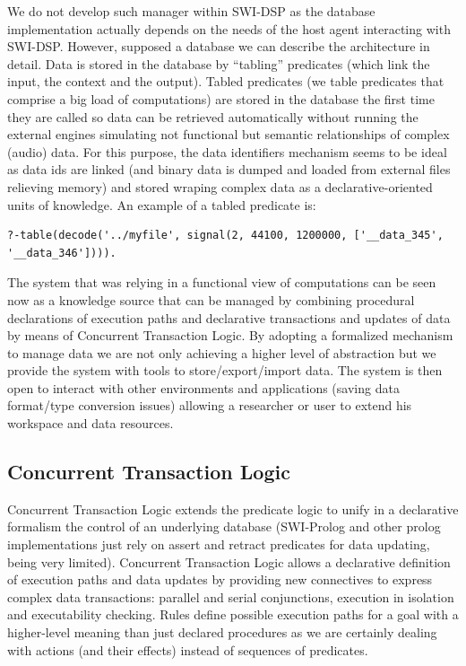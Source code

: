 \documentclass[runningheads]{llncs}
\begin{document}
We do not develop such manager within SWI-DSP as the database implementation actually depends on the needs of the host agent interacting with SWI-DSP. However, supposed a database we can describe the architecture in detail. Data is stored in the database by ``tabling'' predicates (which link the input, the context and the output). Tabled predicates (we table predicates that comprise a big load of computations) are stored in the database the first time they are called so data can be retrieved automatically without running the external engines simulating not functional but semantic relationships of complex (audio) data. For this purpose, the data identifiers mechanism seems to be ideal as data ids are linked (and binary data is dumped and loaded from external files relieving memory) and stored wraping complex data as a declarative-oriented units of knowledge. An example of a tabled predicate is:

\begin{verbatim}
?-table(decode('../myfile', signal(2, 44100, 1200000, ['__data_345', '__data_346']))).
\end{verbatim}

The system that was relying in a functional view of computations can be seen now as a knowledge source that can be managed by combining procedural declarations of execution paths and declarative transactions and updates of data by means of Concurrent Transaction Logic. By adopting a formalized mechanism to manage data we are not only achieving a higher level of abstraction but we provide the system with tools to store/export/import data. The system is then open to interact with other environments and applications (saving data format/type conversion issues) allowing a researcher or user to extend his workspace and data resources.

\subsection{Concurrent Transaction Logic}\label{sec:ctl}

Concurrent Transaction Logic \cite{ctl} extends the predicate logic to unify in a declarative formalism the control of an underlying database (SWI-Prolog and other prolog implementations just rely on assert and retract predicates for data updating, being very limited). Concurrent Transaction Logic allows a declarative definition of execution paths and data updates by providing new connectives to express complex data transactions: parallel and serial conjunctions, execution in isolation and executability checking. Rules define possible execution paths for a goal with a higher-level meaning than just declared procedures as we are certainly dealing with actions (and their effects) instead of sequences of predicates.
\end{document}
